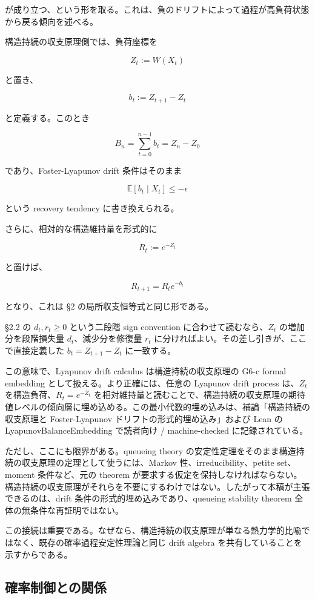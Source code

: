 \documentclass[12pt,a4paper]{article}
\begin{document}
が成り立つ、という形を取る。これは、負のドリフトによって過程が高負荷状態から戻る傾向を述べる。

構造持続の収支原理側では、負荷座標を

\[
Z_{t} := W(X_{t})
\]

と置き、

\[
b_{t} := Z_{t+1}-Z_{t}
\]

と定義する。このとき

\[
B_{n} = \sum_{t=0}^{n-1} b_{t} = Z_{n}-Z_0
\]

であり、Foster-Lyapunov drift 条件はそのまま

\[
\mathbb E[b_{t}\mid X_{t}]\le -\epsilon
\]

という recovery tendency に書き換えられる。

さらに、相対的な構造維持量を形式的に

\[
R_{t} := e^{-Z_{t}}
\]

と置けば、

\[
R_{t+1}=R_{t} e^{-b_{t}}
\]

となり、これは §2 の局所収支恒等式と同じ形である。

§2.2 の \(d_{t},r_{t}\ge 0\) という二段階 sign convention に合わせて読むなら、\(Z_{t}\) の増加分を段階損失量 \(d_{t}\)、減少分を修復量 \(r_{t}\) に分ければよい。その差し引きが、ここで直接定義した \(b_{t}=Z_{t+1}-Z_{t}\) に一致する。

この意味で、Lyapunov drift calculus は構造持続の収支原理の G6-c formal embedding として扱える。より正確には、任意の Lyapunov drift process は、\(Z_{t}\) を構造負荷、\(R_{t}=e^{-Z_{t}}\) を相対維持量と読むことで、構造持続の収支原理の期待値レベルの傾向層に埋め込める。この最小代数的埋め込みは、補論「構造持続の収支原理と Foster-Lyapunov ドリフトの形式的埋め込み」および Lean の LyapunovBalanceEmbedding で読者向け / machine-checked に記録されている。

ただし、ここにも限界がある。queueing theory の安定性定理をそのまま構造持続の収支原理の定理として使うには、Markov 性、irreducibility、petite set、moment 条件など、元の theorem が要求する仮定を保持しなければならない。構造持続の収支原理がそれらを不要にするわけではない。したがって本稿が主張できるのは、drift 条件の形式的埋め込みであり、queueing stability theorem 全体の無条件な再証明ではない。

この接続は重要である。なぜなら、構造持続の収支原理が単なる熱力学的比喩ではなく、既存の確率過程安定性理論と同じ drift algebra を共有していることを示すからである。

\subsection{確率制御との関係}\label{ux78baux7387ux5236ux5fa1ux3068ux306eux95a2ux4fc2}
\end{document}
